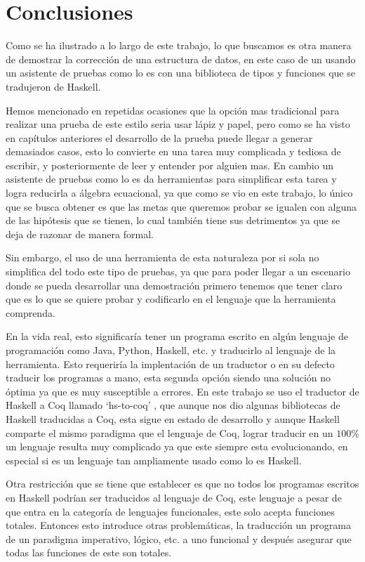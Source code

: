 \chapter{Conclusiones}
Como se ha ilustrado a lo largo de este trabajo, lo que buscamos es otra manera de demostrar la correcci\'on de una estructura de datos,
en este caso de un {\arn} usando un asistente de pruebas como lo es {\coq} con una biblioteca de
tipos y funciones que se tradujeron de Haskell.

Hemos mencionado en repetidas ocasiones que la opci\'on mas tradicional para realizar una prueba de este estilo seria
usar lápiz y papel, pero como se ha visto en capítulos anteriores el desarrollo de la prueba puede llegar a generar demasiados
casos, esto lo convierte en una tarea muy complicada y tediosa de escribir, y posteriormente de leer y
entender por alguien mas. En cambio un asistente de pruebas como lo es {\coq} da herramientas para
simplificar esta tarea y logra reducirla a álgebra ecuacional, ya que como se vio en este trabajo,
lo \'unico que se busca obtener es que las metas que queremos probar se igualen con alguna de las
hip\'otesis que se tienen, lo cual también tiene sus detrimentos ya que se deja de razonar de manera formal.

Sin embargo, el uso de una herramienta de esta naturaleza por si sola no simplifica del todo este
tipo de pruebas, ya que para poder llegar a un escenario donde se pueda desarrollar una demostraci\'on primero
tenemos que tener claro que es lo que se quiere probar y codificarlo en el lenguaje que la
herramienta comprenda.

En la vida real, esto significaría tener un programa escrito en algún lenguaje de programaci\'on
como Java, Python, Haskell, etc. y traducirlo al lenguaje de la herramienta. Esto requeriría la
implentaci\'on de un traductor o en su defecto traducir los programas a mano, esta segunda opci\'on
siendo una soluci\'on no \'optima ya que es muy susceptible a errores. En este trabajo se uso el
traductor de Haskell a Coq llamado `hs-to-coq' \cite{thrc}, que aunque nos dio algunas bibliotecas
de Haskell traducidas a Coq, esta sigue en estado de desarrollo y aunque Haskell comparte el mismo
paradigma que el lenguaje de Coq, lograr traducir en un $100\%$ un lenguaje resulta muy complicado
ya que este siempre esta evolucionando, en especial si es un lenguaje tan ampliamente usado como
lo es Haskell.

Otra restricci\'on que se tiene que establecer es que no todos los programas escritos en Haskell podrían ser traducidos
al lenguaje de Coq, este lenguaje a pesar de que entra en la categoría de lenguajes funcionales, este solo acepta funciones totales. Entonces esto introduce otras problemáticas,
la traducción un programa de un paradigma imperativo, l\'ogico, etc. a uno funcional y después
asegurar que todas las funciones de este son totales.

